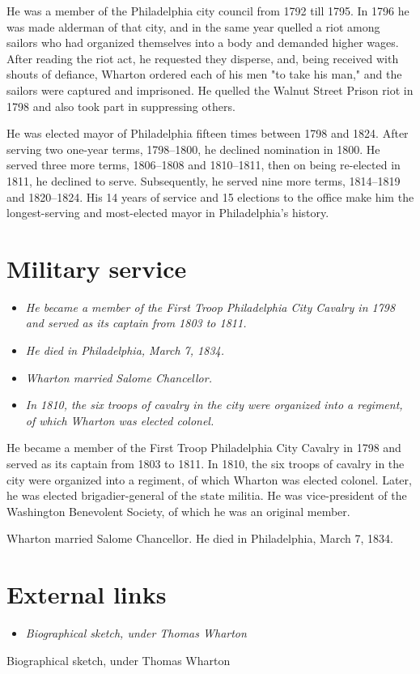 He was a member of the Philadelphia city council from 1792 till 1795. In
1796 he was made alderman of that city, and in the same year quelled a
riot among sailors who had organized themselves into a body and demanded
higher wages. After reading the riot act, he requested they disperse,
and, being received with shouts of defiance, Wharton ordered each of his
men "to take his man," and the sailors were captured and imprisoned. He
quelled the Walnut Street Prison riot in 1798 and also took part in
suppressing others.

He was elected mayor of Philadelphia fifteen times between 1798 and
1824. After serving two one-year terms, 1798--1800, he declined
nomination in 1800. He served three more terms, 1806--1808 and
1810--1811, then on being re-elected in 1811, he declined to serve.
Subsequently, he served nine more terms, 1814--1819 and 1820--1824. His
14 years of service and 15 elections to the office make him the
longest-serving and most-elected mayor in Philadelphia's history.

\section{Military service}\label{military-service}

\begin{itemize}
\item
  \emph{He became a member of the First Troop Philadelphia City Cavalry
  in 1798 and served as its captain from 1803 to 1811.}
\item
  \emph{He died in Philadelphia, March 7, 1834.}
\item
  \emph{Wharton married Salome Chancellor.}
\item
  \emph{In 1810, the six troops of cavalry in the city were organized
  into a regiment, of which Wharton was elected colonel.}
\end{itemize}

He became a member of the First Troop Philadelphia City Cavalry in 1798
and served as its captain from 1803 to 1811. In 1810, the six troops of
cavalry in the city were organized into a regiment, of which Wharton was
elected colonel. Later, he was elected brigadier-general of the state
militia. He was vice-president of the Washington Benevolent Society, of
which he was an original member.

Wharton married Salome Chancellor. He died in Philadelphia, March 7,
1834.

\section{External links}\label{external-links}

\begin{itemize}
\item
  \emph{Biographical sketch, under Thomas Wharton}
\end{itemize}

Biographical sketch, under Thomas Wharton
